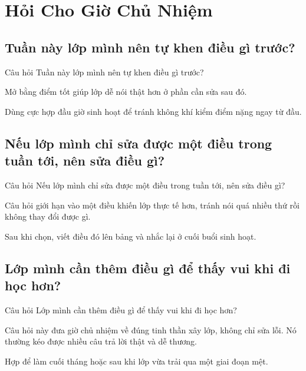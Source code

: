 \chapter{Hỏi Cho Giờ Chủ Nhiệm}

\section{Tuần này lớp mình nên tự khen điều gì trước?}
\begin{cauhoibox}{Câu hỏi}
Tuần này lớp mình nên tự khen điều gì trước?
\end{cauhoibox}
\begin{taisaocoich}
Mở bằng điểm tốt giúp lớp dễ nói thật hơn ở phần cần sửa sau đó.
\end{taisaocoich}
\begin{goiybien}
Dùng cực hợp đầu giờ sinh hoạt để tránh không khí kiểm điểm nặng ngay từ đầu.
\end{goiybien}
\ngancach

\section{Nếu lớp mình chỉ sửa được một điều trong tuần tới, nên sửa điều gì?}
\begin{cauhoibox}{Câu hỏi}
Nếu lớp mình chỉ sửa được một điều trong tuần tới, nên sửa điều gì?
\end{cauhoibox}
\begin{taisaocoich}
Câu hỏi giới hạn vào một điều khiến lớp thực tế hơn, tránh nói quá nhiều thứ rồi không thay đổi được gì.
\end{taisaocoich}
\begin{goiybien}
Sau khi chọn, viết điều đó lên bảng và nhắc lại ở cuối buổi sinh hoạt.
\end{goiybien}
\ngancach

\section{Lớp mình cần thêm điều gì để thấy vui khi đi học hơn?}
\begin{cauhoibox}{Câu hỏi}
Lớp mình cần thêm điều gì để thấy vui khi đi học hơn?
\end{cauhoibox}
\begin{taisaocoich}
Câu hỏi này đưa giờ chủ nhiệm về đúng tinh thần xây lớp, không chỉ sửa lỗi. Nó thường kéo được nhiều câu trả lời thật và dễ thương.
\end{taisaocoich}
\begin{goiybien}
Hợp để làm cuối tháng hoặc sau khi lớp vừa trải qua một giai đoạn mệt.
\end{goiybien}
\ngancach

